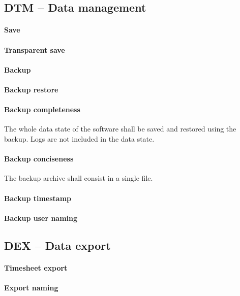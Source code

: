 \subsection{DTM -- Data management}
\paragraph{Save}
\paragraph{Transparent save}
\paragraph{Backup}

\paragraph{Backup restore}

\paragraph{Backup completeness}
The whole data state of the software shall be saved and restored using the
backup. Logs are not included in the data state.

\paragraph{Backup conciseness}
The backup archive shall consist in a single file.

\paragraph{Backup timestamp}

\paragraph{Backup user naming}

\subsection{DEX -- Data export}
\paragraph{Timesheet export}

\paragraph{Export naming}


